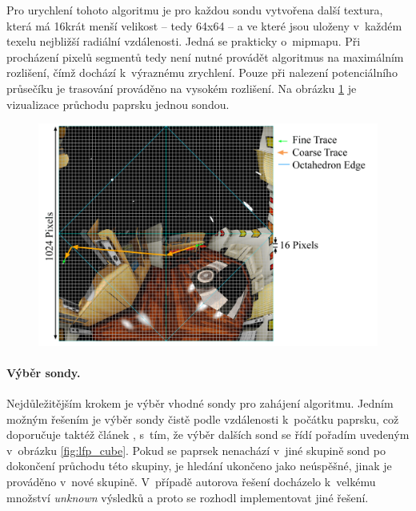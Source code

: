 Pro urychlení tohoto algoritmu je pro každou sondu vytvořena další textura, která má 16krát menší velikost -- tedy 64x64 -- a ve které jsou uloženy v~každém texelu nejbližší radiální vzdálenosti. Jedná se prakticky o~mipmapu. Při procházení pixelů segmentů tedy není nutné provádět algoritmus na maximálním rozlišení, čímž dochází k~výraznému zrychlení. Pouze při nalezení potenciálního průsečíku je trasování prováděno na vysokém rozlišení. Na obrázku \ref{fig:lfp_trace} je vizualizace průchodu paprsku jednou sondou.

\begin{figure}[H]
	\centering
	\includegraphics[scale=0.85]{images/lfp_trace.png}
	\captionsetup{justification=centering}
	\label{fig:lfp_trace}
\end{figure}

\paragraph{Výběr sondy.} Nejdůležitějším krokem je výběr vhodné sondy pro zahájení algoritmu. Jedním možným řešením je výběr sondy čistě podle vzdálenosti k~počátku paprsku, což doporučuje taktéž článek \cite{light_field_probes}, s~tím, že výběr dalších sond se řídí pořadím uvedeným v~obrázku \ref{fig:lfp_cube}. Pokud se paprsek nenachází v~jiné skupině sond po dokončení průchodu této skupiny, je hledání ukončeno jako neúspěšné, jinak je prováděno v~nové skupině. V~případě autorova řešení docházelo k~velkému množství \textit{unknown} výsledků a proto se rozhodl implementovat jiné řešení.

